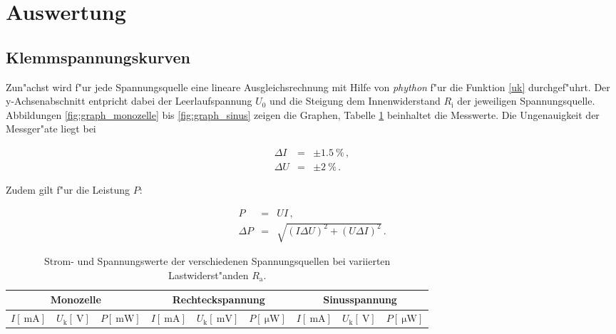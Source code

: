 \clearpage
\section{Auswertung}
\label{sec:auswertung}

	\subsection{Klemmspannungskurven}
	\label{subsec:kurven}
		Zun"achst wird f"ur jede Spannungsquelle eine lineare Ausgleichsrechnung mit Hilfe von \emph{phython} f"ur die Funktion \eqref{uk} durchgef"uhrt.
		Der y-Achsenabschnitt entpricht dabei der Leerlaufspannung $U_0$ und die Steigung dem Innenwiderstand $R_\mathrm{i}$ der jeweiligen Spannungsquelle.
		Abbildungen \ref{fig:graph_monozelle} bis \ref{fig:graph_sinus} zeigen die Graphen, Tabelle \ref{table:monozelle} beinhaltet die Messwerte.
		Die Ungenauigkeit der Messger"ate liegt bei

		\begin{eqnarray*}
			\Delta I & = & \pm \SI{1.5}{\percent} \,, \\
			\Delta U & = & \pm \SI{2}{\percent} \,.
		\end{eqnarray*}

		Zudem gilt f"ur die Leistung $P$:

		\begin{eqnarray*}
			P & = & UI \,, \\
			\Delta P & = & \sqrt{(I \Delta U)^2 + (U \Delta I)^2} \,. 
		\end{eqnarray*}

		\begin{table}[h!]
			\begin{center}
				\caption{Strom- und Spannungswerte der verschiedenen Spannungsquellen bei variierten Lastwiderst"anden $R_\mathrm{a}$. \label{table:monozelle}}
				\begin{tabular}{|c|c|r||c|c|r||c|c|r|}
					\hline
						\multicolumn{3}{|c||}{Monozelle} & \multicolumn{3}{c||}{Rechteckspannung} & \multicolumn{3}{c|}{Sinusspannung} \\
					\hline
						$I [\SI{}{\milli \ampere}]$ & $U_\mathrm{k} [\SI{}{\volt}]$ & $P [\SI{}{\milli \watt}]$ &
						$I [\SI{}{\milli \ampere}]$ & $U_\mathrm{k} [\SI{}{\milli \volt}]$ & $P [\SI{}{\micro \watt}]$ &
						$I [\SI{}{\milli \ampere}]$ & $U_\mathrm{k} [\SI{}{\volt}]$ & $P [\SI{}{\micro \watt}]$\\
					\hline 
					\hline
						
					\hline 
				\end{tabular}
			\end{center}
		\end{table}

